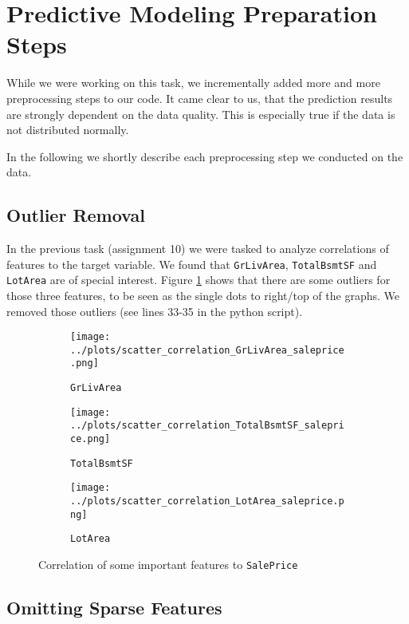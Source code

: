 \section{Predictive Modeling Preparation Steps}

While we were working on this task, we incrementally added more and more preprocessing steps to our code. It came clear to us, that the prediction results are strongly dependent on the data quality. This is especially true if the data is not distributed normally.

In the following we shortly describe each preprocessing step we conducted on the data.

\subsection{Outlier Removal}

In the previous task (assignment 10) we were tasked to analyze correlations of features to the target variable. We found that \texttt{GrLivArea}, \texttt{TotalBsmtSF} and \texttt{LotArea} are of special interest. Figure \ref{fig:saleprice_corr} shows that there are some outliers for those three features, to be seen as the single dots to right/top of the graphs. We removed those outliers (see lines 33-35 in the python script).
\begin{figure}[h]
    \centering
    \begin{subfigure}{.3\textwidth}
        \texttt{[image: ../plots/scatter\_correlation\_GrLivArea\_saleprice.png]}
        \caption{\texttt{GrLivArea}}
    \end{subfigure}
    \begin{subfigure}{.3\textwidth}
        \texttt{[image: ../plots/scatter\_correlation\_TotalBsmtSF\_saleprice.png]}
        \caption{\texttt{TotalBsmtSF}}
    \end{subfigure}
    \begin{subfigure}{.3\textwidth}
        \texttt{[image: ../plots/scatter\_correlation\_LotArea\_saleprice.png]}
        \caption{\texttt{LotArea}}
    \end{subfigure}
    \caption{Correlation of some important features to \texttt{SalePrice}}
    \label{fig:saleprice_corr}
\end{figure}

\subsection{Omitting Sparse Features}


